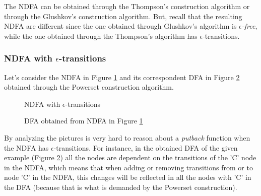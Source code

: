 The NDFA can be obtained through the Thompson's construction algorithm or through the Glushkov's construction algorithm. But, recall that the resulting NDFA are different since the one obtained through Glushkov's algorithm is \textit{$\epsilon$-free}, while the one obtained through the Thompson's algorithm has $\epsilon$-transitions. 

\subsubsection{NDFA with $\epsilon$-transitions}
Let's consider the NDFA in Figure \ref{fig:epsilon} and its correspondent DFA in Figure \ref{fig:epsilondfa} obtained through the Powerset construction algorithm. 

\begin{figure}
    \centering
    \caption{NDFA with $\epsilon$-transitions}
    \label{fig:epsilon}
\end{figure}

\begin{figure}
    \centering
    \caption{DFA obtained from NDFA in Figure \ref{fig:epsilon}}
    \label{fig:epsilondfa}
\end{figure}

By analyzing  the pictures is very hard to reason about a \textit{putback} function when the NDFA has $\epsilon$-transitions. For instance, in the obtained DFA of the given example (Figure \ref{fig:epsilondfa}) all the nodes are dependent on the transitions of the 'C' node in the NDFA, which means that when adding or removing transitions from or to node 'C' in the NDFA, this changes will be reflected in all the nodes with 'C' in the DFA (because that is what is demanded by the Powerset construction).

